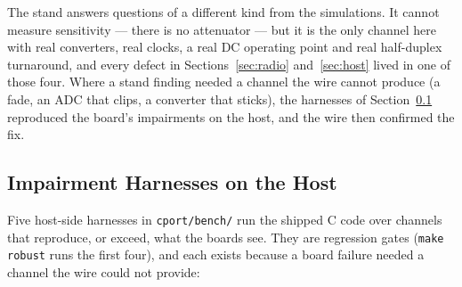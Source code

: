 The stand answers questions of a different kind from the simulations.
It cannot measure sensitivity --- there is no attenuator --- but it is
the only channel here with real converters, real clocks, a real DC
operating point and real half-duplex turnaround, and every defect in
Sections~\ref{sec:radio} and~\ref{sec:host} lived in one of those four.
Where a stand finding needed a channel the wire cannot produce (a
fade, an ADC that clips, a converter that sticks), the harnesses of
Section~\ref{sec:chan_harness} reproduced the board's impairments on
the host, and the wire then confirmed the fix.

\subsection{Impairment Harnesses on the Host}
\label{sec:chan_harness}

Five host-side harnesses in \texttt{cport/bench/} run the shipped C
code over channels that reproduce, or exceed, what the boards see.
They are regression gates (\texttt{make robust} runs the first four),
and each exists because a board failure needed a channel the wire
could not provide:

